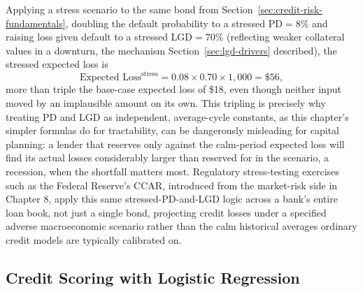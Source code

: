 \documentclass[../ai_in_finance]{subfiles}
\begin{document}
Applying a stress scenario to the same bond from Section~\ref{sec:credit-risk-fundamentals}, doubling the default probability to a stressed $\text{PD}=8\%$ and raising loss given default to a stressed $\text{LGD}=70\%$ (reflecting weaker collateral values in a downturn, the mechanism Section~\ref{sec:lgd-drivers} described), the stressed expected loss is
\begin{equation*}
\text{Expected Loss}^{\text{stress}} = 0.08 \times 0.70 \times 1{,}000 = \$56,
\end{equation*}
more than triple the base-case expected loss of \$18, even though neither input moved by an implausible amount on its own. This tripling is precisely why treating PD and LGD as independent, average-cycle constants, as this chapter's simpler formulas do for tractability, can be dangerously misleading for capital planning: a lender that reserves only against the calm-period expected loss will find its actual losses considerably larger than reserved for in the scenario, a recession, when the shortfall matters most.
Regulatory stress-testing exercises such as the Federal Reserve's CCAR, introduced from the market-risk side in Chapter 8, apply this same stressed-PD-and-LGD logic across a bank's entire loan book, not just a single bond, projecting credit losses under a specified adverse macroeconomic scenario rather than the calm historical averages ordinary credit models are typically calibrated on.

\subsection{Credit Scoring with Logistic Regression}
\label{sec:credit-scoring}
\end{document}
